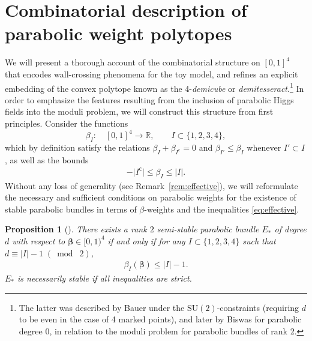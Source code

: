 \documentclass[10pt,a4paper]{amsart}
\newcommand{\field}[1]{\ensuremath{\mathbb{#1}}}
\newcommand{\RR}{\field{R}}
\numberwithin{equation}{section}
\newtheorem{Proposition}[Theorem]{Proposition}
 { \theoremstyle{definition}
\newtheorem{Definition}[Theorem]{Definition}
\newtheorem{Note}[Theorem]{Note}
\newtheorem{Example}[Theorem]{Example}
\newtheorem{Remark}[Theorem]{Remark} }
\begin{document}
\section{Combinatorial description of parabolic weight polytopes}\label{sec:poly}


We will present a thorough account of the combinatorial structure on $[0,1]^{4}$ that encodes wall-crossing phenomena for the toy model, and refines an explicit embedding of the convex polytope known as the 4-\textit{demicube} or \textit{demitesseract}.\footnote{The latter was described by Bauer \cite{Bau91} under the $\mathrm{SU}(2)$-constraints (requiring $d$ to be even in the case of 4 marked points), and later by Biswas \cite{Bis98} for parabolic degree 0, in relation to the moduli problem for parabolic bundles of rank 2.} In order to emphasize the features resulting from the inclusion of parabolic Higgs fields into the moduli problem, we will construct this structure from first principles. Consider the functions
\[
\beta_{I}\colon\quad [0,1]^{4}\rightarrow \RR,\qquad I\subset\{1,2,3,4\},
\]
which by definition satisfy the relations $\beta_{I}+\beta_{I^{\mathsf{c}}}=0$ and $\beta_{I'}\leq \beta_{I}$ whenever $I'\subset I$, as well as the bounds
\begin{gather}\label{eq:bounds}
-\vert I^{\mathsf{c}}\vert \leq \beta_{I}\leq \vert I\vert.
\end{gather}
Without any loss of generality (see Remark~\ref{rem:effective}), we will reformulate the necessary and sufficient conditions on parabolic weights for the existence of stable parabolic bundles in terms of $\beta$-weights and the inequalities \eqref{eq:effective}.

\begin{Proposition}[\cite{Bau91, Bis98}]\label{prop:B-B}
There exists a rank $2$ semi-stable parabolic bundle $E_{*}$ of degree $d$ with respect to $\pmb{\beta}\in[0,1)^{4}$ if and only if for any $I\subset\{1,2,3,4\}$ such that $d \equiv \vert I\vert -1\; (\bmod\; 2)$,
\begin{gather}\label{eq:Biswas-ineq}
 \beta_{I}(\pmb{\beta}) \leq \vert I\vert-1.
\end{gather}
$E_{*}$ is necessarily stable if all inequalities are strict.
\end{Proposition}
\end{document}
